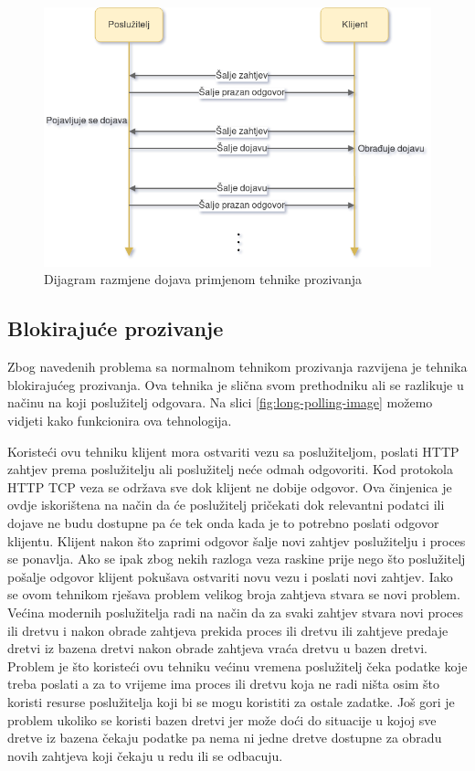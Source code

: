 \documentclass[times, utf8, zavrsni]{fer}
\begin{document}
\begin{figure}[htb]
\centering
\includegraphics[width=14cm]{img/polling.png}
\caption{Dijagram razmjene dojava primjenom tehnike prozivanja}
\label{fig:polling-image}
\end{figure}

\subsection{Blokirajuće prozivanje}
Zbog navedenih problema sa normalnom tehnikom prozivanja razvijena je tehnika blokirajućeg prozivanja. Ova tehnika je slična svom prethodniku ali se razlikuje u načinu na koji poslužitelj odgovara. Na slici \ref{fig:long-polling-image} možemo vidjeti kako funkcionira ova tehnologija. 

Koristeći ovu tehniku klijent mora ostvariti vezu sa poslužiteljom, poslati HTTP zahtjev prema poslužitelju ali poslužitelj neće odmah odgovoriti. Kod protokola HTTP TCP veza se održava sve dok klijent ne dobije odgovor. Ova činjenica je ovdje iskorištena na način da će poslužitelj pričekati dok relevantni podatci ili dojave ne budu dostupne pa će tek onda kada je to potrebno poslati odgovor klijentu. Klijent nakon što zaprimi odgovor šalje novi zahtjev poslužitelju i proces se ponavlja. Ako se ipak zbog nekih razloga veza raskine prije nego što poslužitelj pošalje odgovor klijent pokušava ostvariti novu vezu i poslati novi zahtjev. Iako se ovom tehnikom rješava problem velikog broja zahtjeva stvara se novi problem. Većina modernih poslužitelja radi na način da za svaki zahtjev stvara novi proces ili dretvu i nakon obrade zahtjeva prekida proces ili dretvu ili zahtjeve predaje dretvi iz bazena dretvi nakon obrade zahtjeva  vraća dretvu u bazen dretvi. Problem je što koristeći ovu tehniku većinu vremena poslužitelj čeka podatke koje treba poslati a za to vrijeme ima proces ili dretvu koja ne radi ništa osim što koristi resurse poslužitelja koji bi se mogu koristiti za ostale zadatke. Još gori je problem ukoliko se koristi bazen dretvi jer može doći do situacije u kojoj sve dretve iz bazena čekaju podatke pa nema ni jedne dretve dostupne za obradu novih zahtjeva koji čekaju u redu ili se odbacuju.
\end{document}
